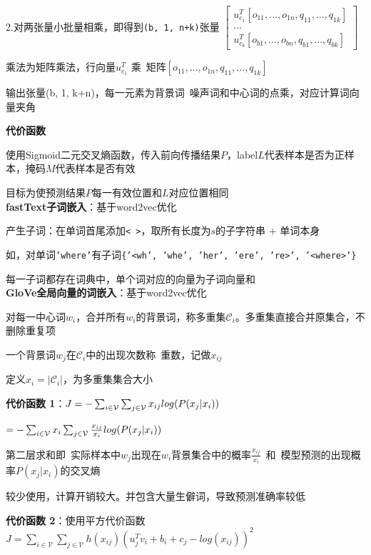 \documentclass[UTF8]{ctexart}
\begin{document}
  \quad 2.对两张量小批量相乘，即得到\texttt{(b, 1, n+k)}张量
  $\begin{bmatrix}
    u_{c_1}^T [o_{11}, ..., o_{1n}, q_{11}, ..., q_{1k}] \\
    ... \\
    u_{c_b}^T [o_{b1}, ..., o_{bn}, q_{b1}, ..., q_{bk}]
    \end{bmatrix}
  $

  \quad 乘法为矩阵乘法，行向量$u_{c_1}^T$ 乘\ 矩阵$[o_{11}, ..., o_{1n}, q_{11}, ..., q_{1k}]$
  
  \quad 输出张量(b, 1, k+n)，每一元素为背景词\ 噪声词和中心词的点乘，对应计算词向量夹角
  
  \textbf{代价函数}

  \quad 使用Sigmoid二元交叉熵函数，传入前向传播结果$P$，label$L$代表样本是否为正样本，掩码$M$代表样本是否有效

  \quad 目标为使预测结果$P$每一有效位置和$L$对应位置相同\\
\textbf{fastText子词嵌入}：基于word2vec优化

  产生子词：在单词首尾添加\texttt{< >}，取所有长度为$s$的子字符串 + 单词本身

  \quad 如，对单词\texttt{'where'}有子词\texttt{\{'<wh', 'whe', 'her', 'ere', 're>', '<where>'\}}

  每一子词都存在词典中，单个词对应的向量为子词向量和\\
\textbf{GloVe全局向量的词嵌入}：基于word2vec优化

  对每一中心词$w_i$，合并所有$w_i$的背景词，称多重集$\mathcal{C}_i$。多重集直接合并原集合，不删除重复项

  \quad 一个背景词$w_j$在$\mathcal{C}_i$中的出现次数称\ 重数，记做$x_{ij}$

  \quad 定义$x_i = |\mathcal{C}_i|$，为多重集集合大小

  \textbf{代价函数 1}：$J = -\sum_{i\in \mathcal{V} }\sum_{j\in \mathcal{V} }x_{ij} \space log(P(x_j | x_i))$  

  \quad $= -\sum_{i\in \mathcal{V} }x_{i} \sum_{j\in \mathcal{V} } \frac{x_{ij}}{x_i}\space log(P(x_j | x_i))$

  \quad 第二层求和即\ 实际样本中$w_j$出现在$w_i$背景集合中的概率$\frac{x_{ij}}{x_i}$\ 和\ 模型预测的出现概率$P(x_j | x_i)$的交叉熵

  \quad * 较少使用，计算开销较大。并包含大量生僻词，导致预测准确率较低

  \textbf{代价函数 2}：使用平方代价函数$J = \sum_{i \in \mathcal{V}}\sum_{j \in \mathcal{V}}h(x_{ij})(u_j^Tv_i + b_i + c_j -log(x_{ij}))^2$
\end{document}
